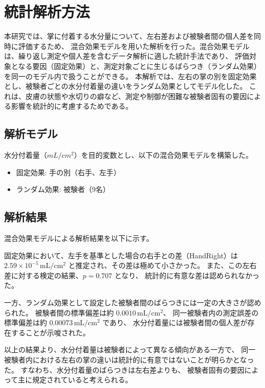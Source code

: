 
\section{統計解析方法}

本研究では、掌に付着する水分量について、左右差および被験者間の個人差を同時に評価するため、
混合効果モデルを用いた解析を行った。混合効果モデルは、繰り返し測定や個人差を含むデータ解析に適した統計手法であり、
評価対象となる要因（固定効果）と、測定対象ごとに生じるばらつき（ランダム効果）を同一のモデル内で扱うことができる。
本解析では、左右の掌の別を固定効果とし、被験者ごとの水分付着量の違いをランダム効果としてモデル化した。
これは、皮膚の状態や水切りの癖など、測定や制御が困難な被験者固有の要因による影響を統計的に考慮するためである。

\newpage
\subsection{解析モデル}
水分付着量（$mL/cm^2$）を目的変数とし、以下の混合効果モデルを構築した。
\begin{itemize}
    \item 固定効果: 手の別（右手、左手）
    \item ランダム効果: 被験者（9名）
\end{itemize}

\subsection{解析結果}

混合効果モデルによる解析結果を以下に示す。

固定効果において、左手を基準とした場合の右手との差（HandRight）は
$2.59 \times 10^{-5}\,\mathrm{mL/cm^2}$ と推定され、その差は極めて小さかった。
また、この左右差に対する検定の結果、$p = 0.707$ となり、
統計的に有意な差は認められなかった。

一方、ランダム効果として設定した被験者間のばらつきには一定の大きさが認められた。
被験者間の標準偏差は約 $0.0010\,\mathrm{mL/cm^2}$、
同一被験者内の測定誤差の標準偏差は約 $0.00073\,\mathrm{mL/cm^2}$ であり、
水分付着量には被験者間の個人差が存在することが示唆された。

以上の結果より、水分付着量は被験者によって異なる傾向がある一方で、
同一被験者内における左右の掌の違いは統計的に有意ではないことが明らかとなった。
すなわち、水分付着量のばらつきは左右差よりも、
被験者固有の要因によって主に規定されていると考えられる。

